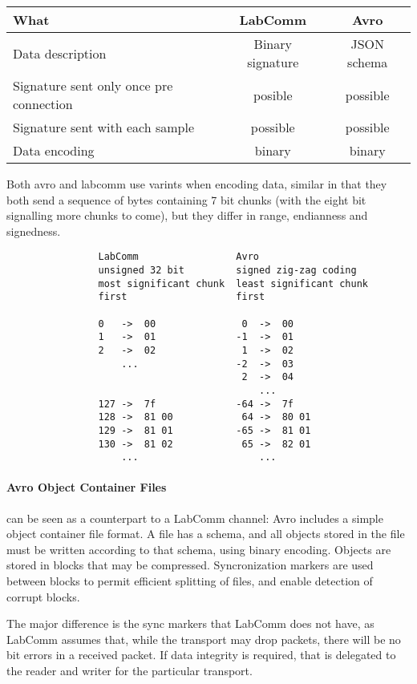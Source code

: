 \documentclass[a4paper]{article}
\begin{document}
\begin{tabular}{|l|c|c|}
  \hline
  What & LabComm & Avro \\ \hline
  Data description & Binary signature & JSON schema \\
  Signature sent only once pre connection& posible & possible \\
  Signature sent with each sample & possible & possible \\
  Data encoding & binary & binary \\
  \hline
\end{tabular}


Both avro and labcomm use varints when encoding data, similar in that
they both send a sequence of bytes containing 7 bit chunks (with the
eight bit signalling more chunks to come), but they differ in range,
endianness and signedness.

\begin{verbatim}
                LabComm                 Avro
                unsigned 32 bit         signed zig-zag coding
                most significant chunk  least significant chunk
                first                   first

                0   ->  00               0  ->  00
                1   ->  01              -1  ->  01
                2   ->  02               1  ->  02
                    ...                 -2  ->  03
                                         2  ->  04
                                            ...
                127 ->  7f              -64 ->  7f
                128 ->  81 00            64 ->  80 01
                129 ->  81 01           -65 ->  81 01
                130 ->  81 02            65 ->  82 01
                    ...                     ...   
\end{verbatim}

\paragraph{Avro Object Container Files} can be seen as a counterpart
  to a LabComm channel: 
Avro includes a simple object container file format. A file has a
schema, and all objects stored in the file must be written according to
that schema, using binary encoding. Objects are stored in blocks that
may be compressed. Syncronization markers are used between blocks to
permit efficient splitting of files, and enable detection of 
corrupt blocks.


The major difference is the sync markers that LabComm does not have, as
LabComm assumes that, while the transport may drop packets, there will
be no bit errors in a received packet. If data integrity is required,
that is delegated to the reader and writer for the particular transport.
\end{document}
